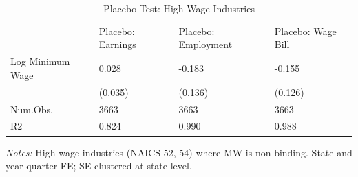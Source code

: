 \begin{table}[!htbp]
\centering
\caption{Placebo Test: High-Wage Industries}
\label{tab:placebo}
\begin{threeparttable}
\begin{tabular}{llll}
& Placebo: Earnings & Placebo: Employment & Placebo: Wage Bill \\
Log Minimum Wage & 0.028 & -0.183 & -0.155 \\
& (0.035) & (0.136) & (0.126) \\
Num.Obs. & 3663 & 3663 & 3663 \\
R2 & 0.824 & 0.990 & 0.988 \\
\end{tabular}
\begin{tablenotes}[flushleft]
\small
\item \textit{Notes:} High-wage industries (NAICS 52, 54) where MW is non-binding. State and year-quarter FE; SE clustered at state level.
\end{tablenotes}
\end{threeparttable}
\end{table}
